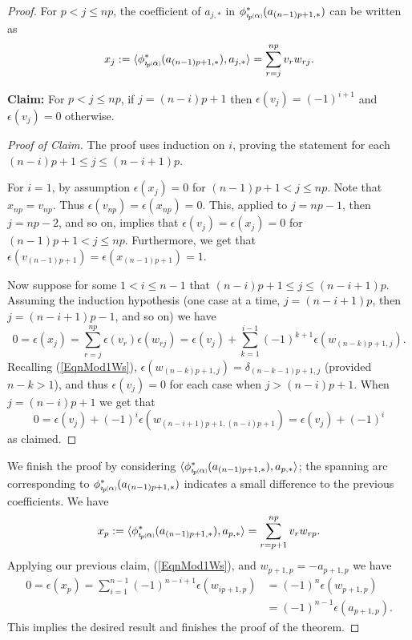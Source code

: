 \documentclass[11pt]{amsart}
\newcommand*{\subsmallp}[1]{\scalebox{.5}{\ensuremath#1}}
\newcommand{\subpp}[2][p]{\imath_{\hspace*{-1pt}#1}\hspace*{-.5pt}\subsmallp(#2\subsmallp)}
\theoremstyle{definition}
\begin{document}
\begin{proof}
For $p<j\le np$, the coefficient of $a_{j,\ast}$ in $\phi^\ast_{\subpp\alpha}(a_{(n-1)p+1,\ast})$ can be written as
      \begin{equation}x_j := \langle \phi^{\ast}_{\subpp\alpha}(a_{(n-1)p+1,\ast}), a_{j,\ast} \rangle = \sum_{r=j}^{np}v_rw_{rj}.
      \label{eqnCurveExpansion}
      \end{equation}

{\bf Claim:} For $p < j \le np$, if $j=(n-i)p+1$ then $\epsilon(v_j)=(-1)^{i+1}$ and $\epsilon(v_j)=0$ otherwise.
\begin{proof}[Proof of Claim] The proof uses induction on $i$, proving the statement for each $(n-i)p+1\le j\le (n-i+1)p$. 

For $i=1$, by assumption $\epsilon(x_j)=0$ for $(n-1)p+1<j\le np$. Note that $x_{np} = v_{np}$. Thus $\epsilon(v_{np})=\epsilon(x_{np}) = 0$. This, applied to $j=np-1$, then $j=np-2$, and so on, implies that $\epsilon(v_j) = \epsilon(x_j) = 0$ for $(n-1)p+1<j\le np$. Furthermore, we get that $\epsilon(v_{(n-1)p+1}) = \epsilon(x_{(n-1)p+1}) = 1$.

Now suppose for some $1<i\le n-1$ that $(n-i)p+1\le j \le (n-i+1)p$. Assuming the induction hypothesis (one case at a time, $j=(n-i+1)p$, then $j=(n-i+1)p-1$, and so on) we have
      \[0 = \epsilon(x_j) = \sum_{r=j}^{np}\epsilon(v_r)\epsilon(w_{rj}) = \epsilon(v_j) + \sum_{k=1}^{i-1}(-1)^{k+1}\epsilon(w_{(n-k)p+1,j}).\]
Recalling (\ref{EqnMod1Ws}), $\epsilon(w_{(n-k)p+1,j})=\delta_{(n-k-1)p+1,j}$ (provided $n-k>1$), and thus $\epsilon(v_j) = 0$ for each case when $j>(n-i)p+1$. When $j=(n-i)p+1$ we get that 
      \[0 = \epsilon(v_j) + (-1)^{i}\epsilon(w_{(n-i+1)p+1,(n-i)p+1}) = \epsilon(v_j) + (-1)^{i}\]
\noindent as claimed.
\end{proof}

We finish the proof by considering $\langle \phi^{\ast}_{\subpp\alpha}(a_{(n-1)p+1,\ast}), a_{p,\ast} \rangle$; the spanning arc corresponding to $\phi^{\ast}_{\subpp\alpha}(a_{(n-1)p+1,\ast})$ indicates a small difference to the previous coefficients. We have
      \[x_p := \langle \phi^{\ast}_{\subpp\alpha}(a_{(n-1)p+1,\ast}), a_{p,\ast} \rangle = \sum_{r=p+1}^{np}v_rw_{rp}.\]
Applying our previous claim, (\ref{EqnMod1Ws}), and $w_{p+1,p}=-a_{p+1,p}$ we have
        \begin{align*}
        0 = \epsilon(x_p)   = \sum_{i=1}^{n-1}(-1)^{n-i+1}\epsilon(w_{ip+1,p})  &= (-1)^n\epsilon(w_{p+1,p})\\
                                                                                &= (-1)^{n-1}\epsilon(a_{p+1,p}).
        \end{align*}
This implies the desired result and finishes the proof of the theorem. 
\end{proof}
\end{document}
